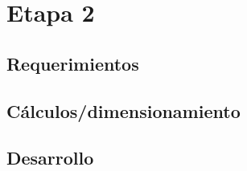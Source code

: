 \section{Etapa 2}
\lipsum[0-1]

\subsection{Requerimientos}

\subsection{C\'alculos/dimensionamiento}

\subsection{Desarrollo }


